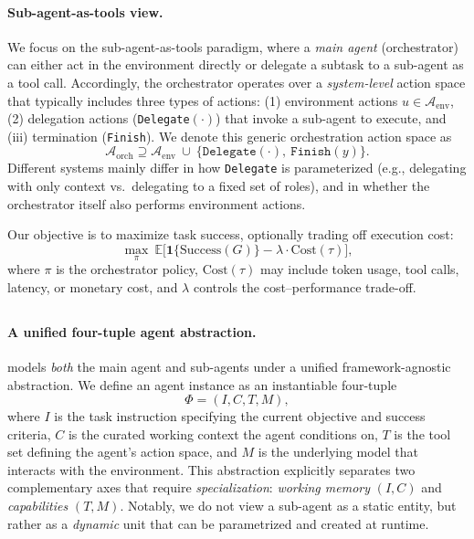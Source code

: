 \paragraph{Sub-agent-as-tools view.}
We focus on the sub-agent-as-tools paradigm, where a \emph{main agent} (orchestrator) can either act in the environment directly or delegate a subtask to a sub-agent as a tool call.
Accordingly, the orchestrator operates over a \emph{system-level} action space that typically includes three types of actions:
(1) environment actions $u \in \mathcal{A}_{\text{env}}$,
(2) delegation actions (\texttt{Delegate}$(\cdot)$) that invoke a sub-agent to execute,
and (iii) termination (\texttt{Finish}).
We denote this generic orchestration action space as
\[
\mathcal{A}_{\text{orch}} \supseteq \mathcal{A}_{\text{env}} \ \cup\ \{\texttt{Delegate}(\cdot),\ \texttt{Finish}(y)\}.
\]
Different systems mainly differ in how \texttt{Delegate} is parameterized (e.g., delegating with only context vs.\ delegating to a fixed set of roles), and in whether the orchestrator itself also performs environment actions.

Our objective is to maximize task success, optionally trading off execution cost:
\[
\max_{\pi}\ \mathbb{E}\Big[\mathbf{1}\{\text{Success}(G)\}-\lambda\cdot \text{Cost}(\tau)\Big],
\]
where $\pi$ is the orchestrator policy, $\text{Cost}(\tau)$ may include token usage, tool calls, latency, or monetary cost, and $\lambda$ controls the cost--performance trade-off.


\subsection{\our{} }
\label{sec:method_design}

\paragraph{A unified four-tuple agent abstraction.}
\our{} models \emph{both} the main agent and sub-agents under a unified framework-agnostic abstraction.
We define an agent instance as an instantiable four-tuple
\[
\Phi = (I, C, T, M),
\]
where $I$ is the task instruction specifying the current objective and success criteria,
$C$ is the curated working context the agent conditions on,
$T$ is the tool set defining the agent's action space,
and $M$ is the underlying model that interacts with the environment.
This abstraction explicitly separates two complementary axes that require \textit{specialization}:
\emph{working memory} $(I,C)$ and \emph{capabilities} $(T,M)$.
Notably, we do not view a sub-agent as a static entity, but rather as a \emph{dynamic} unit that can be parametrized and created at runtime. 

